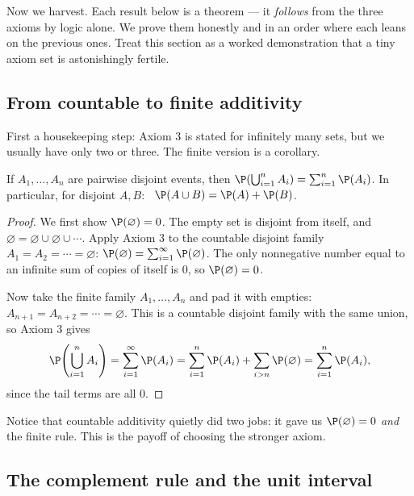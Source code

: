 Now we harvest. Each result below is a theorem --- it \emph{follows} from the
three axioms by logic alone. We prove them honestly and in an order where each
leans on the previous ones. Treat this section as a worked demonstration that a
tiny axiom set is astonishingly fertile.

\subsection{From countable to finite additivity}
\label{ch03:finite-add}

First a housekeeping step: Axiom 3 is stated for infinitely many sets, but we
usually have only two or three. The finite version is a corollary.

\begin{proposition}
\label{ch03:prop-finite-add}
If $A_1, \dots, A_n$ are pairwise disjoint events, then
$\P\!\left(\bigcup_{i=1}^{n} A_i\right) = \sum_{i=1}^{n} \P(A_i)$. In particular,
for disjoint $A, B$: \ $\P(A \cup B) = \P(A) + \P(B)$.
\end{proposition}

\begin{proof}
We first show $\P(\varnothing) = 0$. The empty set is disjoint from itself, and
$\varnothing = \varnothing \cup \varnothing \cup \cdots$. Apply Axiom 3 to the
countable disjoint family $A_1 = A_2 = \cdots = \varnothing$:
$\P(\varnothing) = \sum_{i=1}^\infty \P(\varnothing)$. The only nonnegative
number equal to an infinite sum of copies of itself is $0$, so
$\P(\varnothing) = 0$.

Now take the finite family $A_1, \dots, A_n$ and pad it with empties:
$A_{n+1} = A_{n+2} = \cdots = \varnothing$. This is a countable disjoint family
with the same union, so Axiom 3 gives
\[
\P\!\left(\bigcup_{i=1}^{n} A_i\right)
= \sum_{i=1}^{\infty} \P(A_i)
= \sum_{i=1}^{n} \P(A_i) + \sum_{i>n} \P(\varnothing)
= \sum_{i=1}^{n} \P(A_i),
\]
since the tail terms are all $0$.
\end{proof}

Notice that countable additivity quietly did two jobs: it gave us
$\P(\varnothing)=0$ \emph{and} the finite rule. This is the payoff of choosing the
stronger axiom.

\subsection{The complement rule and the unit interval}
\label{ch03:complement}

